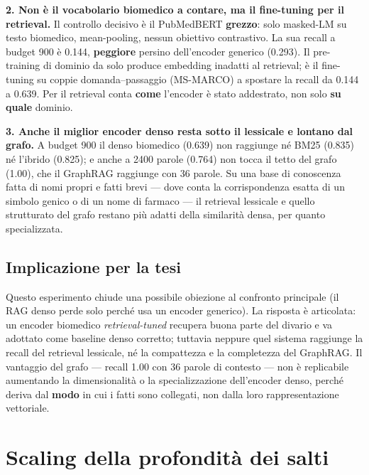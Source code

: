 \documentclass[11pt,a4paper]{report}
\begin{document}
\textbf{2. Non è il vocabolario biomedico a contare, ma il fine-tuning per il
retrieval.} Il controllo decisivo è il PubMedBERT \textbf{grezzo}: solo
masked-LM su testo biomedico, mean-pooling, nessun obiettivo contrastivo. La
sua recall a budget \num{900} è \num{0,144}, \textbf{peggiore} persino
dell'encoder generico (\num{0,293}). Il pre-training di dominio da solo produce
embedding inadatti al retrieval; è il fine-tuning su coppie domanda--passaggio
(MS-MARCO) a spostare la recall da \num{0,144} a \num{0,639}. Per il retrieval
conta \textbf{come} l'encoder è stato addestrato, non solo \textbf{su quale}
dominio.

\textbf{3. Anche il miglior encoder denso resta sotto il lessicale e lontano
dal grafo.} A budget \num{900} il denso biomedico (\num{0,639}) non raggiunge
né BM25 (\num{0,835}) né l'ibrido (\num{0,825}); e anche a \num{2400} parole
(\num{0,764}) non tocca il tetto del grafo (\num{1,00}), che il GraphRAG
raggiunge con \num{36} parole. Su una base di conoscenza fatta di nomi propri e
fatti brevi --- dove conta la corrispondenza esatta di un simbolo genico o di
un nome di farmaco --- il retrieval lessicale e quello strutturato del grafo
restano più adatti della similarità densa, per quanto specializzata.

\section{Implicazione per la tesi}

Questo esperimento chiude una possibile obiezione al confronto principale
(\guillemotleft{}il RAG denso perde solo perché usa un encoder generico\guillemotright{}). La risposta è
articolata: un encoder biomedico \emph{retrieval-tuned} recupera buona parte
del divario e va adottato come baseline denso corretto; tuttavia neppure quel
sistema raggiunge la recall del retrieval lessicale, né la compattezza e la
completezza del GraphRAG. Il vantaggio del grafo --- recall \num{1,00} con
\num{36} parole di contesto --- non è replicabile aumentando la dimensionalità
o la specializzazione dell'encoder denso, perché deriva dal \textbf{modo} in
cui i fatti sono collegati, non dalla loro rappresentazione vettoriale.


\chapter{Scaling della profondità dei salti}
\label{ch:profondita-salti}
\end{document}
